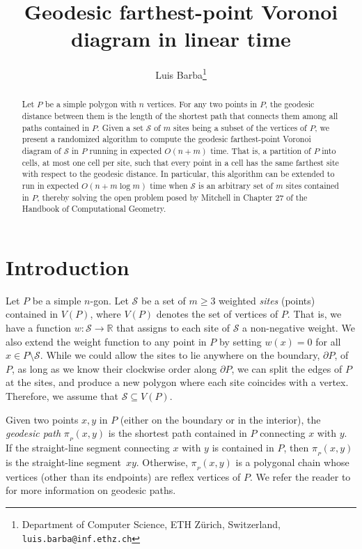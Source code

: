 \documentclass[a4paper, 11pt]{article}
\title{Geodesic farthest-point Voronoi diagram in linear time}
\author{Luis Barba\thanks{Department of Computer Science, ETH Z\"urich, Switzerland, \texttt{luis.barba@inf.ethz.ch}}}
\date{}
\newcommand{\s}{\mathcal S}
\newcommand{\p}[3][P]{\ensuremath{\pi_{_{#1}}(#2, #3)}}
\begin{document}
\maketitle

\begin{abstract}
Let $P$ be a simple polygon with $n$ vertices.
For any two points in $P$, the geodesic distance between them is the length of the shortest path that connects them among all paths contained in $P$. 
Given a set $\s$ of $m$ sites being a subset of  the vertices of $P$, we present a randomized algorithm to compute the geodesic farthest-point Voronoi diagram of $\s$ in $P$ running in expected $O(n + m)$ time. 
That is, a partition of $P$ into cells, at most one cell per site, such that every point in a cell has the same farthest site with respect to the geodesic distance. 
In particular, this algorithm can be extended to run in expected $O(n + m\log m)$ time when $\s$ is an arbitrary set of $m$ sites contained in $P$, thereby solving the open problem posed by Mitchell in Chapter 27 of the Handbook of Computational Geometry.
\end{abstract}



\section{Introduction}
Let $P$ be a simple $n$-gon.
Let $\s$ be a set of $m\geq 3$ weighted \emph{sites} (points) contained in $V(P)$, where $V(P)$ denotes the set of vertices of $P$. 
That is, we have a function $w:\s\to \mathbb{R}$ that assigns to each site of $\s$ a non-negative weight. 
We also extend the weight function to any point in $P$ by setting $w(x) = 0$ for all $x\in P\setminus \s$.
While we could allow the sites to lie anywhere on the boundary, $\partial P$, of $P$, as long as we know their clockwise order along $\partial P$, we can split the edges of $P$ at the sites, and produce a new polygon where each site coincides with a vertex. Therefore, we assume that $\s\subseteq V(P)$.

Given two points $x,y$ in $P$ (either on the boundary or in the interior), the \emph{geodesic path} $\p{x}{y}$ is the shortest path contained in $P$ connecting $x$ with $y$. If the straight-line segment connecting $x$ with $y$ is contained in $P$, then $\p{x}{y}$ is the straight-line segment~$xy$. 
Otherwise, $\p{x}{y}$ is a polygonal chain whose vertices (other than its endpoints) are  reflex vertices of $P$. 
We refer the reader to~\cite{m-gspno-00} for more information on geodesic paths.
\end{document}
